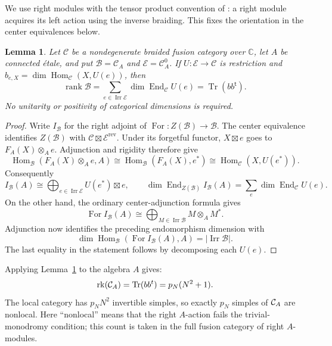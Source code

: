 \documentclass[11pt,a4paper]{article}
\numberwithin{equation}{section}
\newtheorem{lemma}[theorem]{Lemma}
\theoremstyle{definition}\newtheorem{definition}[theorem]{Definition}
\theoremstyle{remark}\newtheorem{remark}[theorem]{Remark}
\newcommand{\parityrank}{p_N}
\begin{document}
We use right modules with the tensor product convention of
\cite[Section 3.3]{dmno}: a right module acquires its left action
using the inverse braiding. This fixes the orientation in the center
equivalences below.

\begin{lemma}\label{lem:branching-rank}
Let $\mathcal C$ be a nondegenerate braided fusion category over
$\mathbb C$, let $A$ be connected \'etale, and put
$\mathcal B=\mathcal C_A$ and $\mathcal E=\mathcal C_A^0$.
If $U:\mathcal E\to\mathcal C$ is restriction and
$b_{e,X}=\dim\operatorname{Hom}_{\mathcal C}(X,U(e))$, then
\[
 \operatorname{rank}\mathcal B
 =\sum_{e\in\operatorname{Irr}\mathcal E}
       \dim\operatorname{End}_{\mathcal C}U(e)
 =\operatorname{Tr}(bb^{\mathsf t}).
\]
No unitarity or positivity of categorical dimensions is required.
\end{lemma}
\begin{proof}
Write $I_{\mathcal B}$ for the right adjoint of
$\operatorname{For}:Z(\mathcal B)\to\mathcal B$.
The center equivalence
\cite[Corollary 3.30 and Remark 3.31(i)]{dmno}
identifies $Z(\mathcal B)$ with
$\mathcal C\boxtimes\mathcal E^{\mathrm{rev}}$.
Under its forgetful functor, $X\boxtimes e$ goes to
$F_A(X)\otimes_A e$.
Adjunction and rigidity therefore give
\[
 \operatorname{Hom}_{\mathcal B}(F_A(X)\otimes_A e,A)
 \cong\operatorname{Hom}_{\mathcal B}(F_A(X),e^*)
 \cong\operatorname{Hom}_{\mathcal C}(X,U(e^*)).
\]
Consequently
\[
 I_{\mathcal B}(A)
 \cong\bigoplus_{e\in\operatorname{Irr}\mathcal E}U(e^*)\boxtimes e,
 \qquad
 \dim\operatorname{End}_{Z(\mathcal B)}I_{\mathcal B}(A)
 =\sum_e\dim\operatorname{End}_{\mathcal C}U(e).
\]
On the other hand, the ordinary center-adjunction formula
\cite[Proposition 9.2.2]{egno} gives
\[
 \operatorname{For}I_{\mathcal B}(A)
 \cong\bigoplus_{M\in\operatorname{Irr}\mathcal B}M\otimes_A M^*.
\]
Adjunction now identifies the preceding endomorphism dimension with
\[
 \dim\operatorname{Hom}_{\mathcal B}
 (\operatorname{For}I_{\mathcal B}(A),A)
 =|\operatorname{Irr}\mathcal B|.
\]
The last equality in the statement follows by decomposing each $U(e)$.
\end{proof}


Applying Lemma~\ref{lem:branching-rank} to the algebra $A$ gives:
\begin{equation}\label{r:eq:rankfull}
  \operatorname{rk}(\Cat_A)=\operatorname{Tr}(bb^t)=\parityrank(N^2+1).
\end{equation}
The local category has $\parityrank N^2$ invertible simples, so
exactly $\parityrank$ simples of $\mathcal C_A$ are nonlocal. Here
``nonlocal'' means that the right $A$-action fails the trivial-monodromy
condition; this count is taken in the full fusion category of
right $A$-modules.
\end{document}
